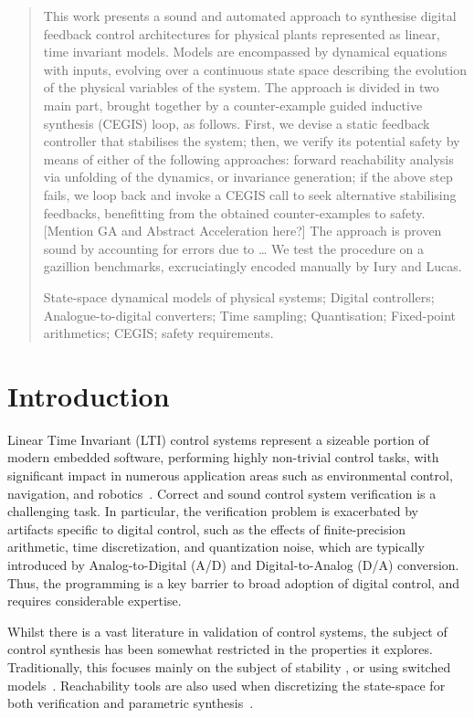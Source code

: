 \documentclass[runningheads,a4paper]{llncs}
\newcommand{\keywords}[1]{\par\addvspace\baselineskip
\noindent\keywordname\enspace\ignorespaces#1}
\begin{document}
\begin{abstract}
This work presents a sound and automated approach to synthesise digital feedback control architectures for physical plants represented as linear, time invariant models. 
Models are encompassed by dynamical equations with inputs, evolving over a continuous state space describing the evolution of the physical variables of the system.  
The approach is divided in two main part, brought together by a counter-example guided inductive synthesis (CEGIS) loop, as follows.   
First, we devise a static feedback controller that stabilises the system;  
then, we verify its potential safety by means of either of the following approaches: 
forward reachability analysis via unfolding of the dynamics, or invariance generation;  
if the above step fails, we loop back and invoke a CEGIS call to seek alternative stabilising feedbacks, 
benefitting from the obtained counter-examples to safety. 
[Mention GA and Abstract Acceleration here?] 
The approach is proven sound by accounting for errors due to \ldots 
We test the procedure on a gazillion benchmarks, excruciatingly encoded manually by Iury and Lucas. 
\keywords{
State-space dynamical models of physical systems; 
Digital controllers; 
Analogue-to-digital converters; 
Time sampling; 
Quantisation; 
Fixed-point arithmetics; 
CEGIS; 
safety requirements. 
}
\end{abstract}


\section{Introduction}

Linear Time Invariant (LTI) control systems represent a sizeable portion of
modern embedded software, performing highly non-trivial control tasks,
with significant impact in numerous application areas such as
environmental control, navigation, and 
robotics~\cite{astrom1997computer,Franklin15}.
Correct and sound control system verification is a challenging task. 
In particular, the verification problem is exacerbated by artifacts specific 
to digital control, such as the effects of finite-precision arithmetic, 
time discretization, and quantization noise, which are typically introduced 
by Analog-to-Digital (A/D) and Digital-to-Analog (D/A) conversion.  
Thus, the programming is a key barrier to broad adoption of digital control, 
and requires considerable expertise.

Whilst there is a vast literature in validation of control systems,
the subject of control synthesis has been somewhat restricted in the
properties it explores.  Traditionally, this focuses mainly on the
subject of stability %
\cite{DBLP:journals/corr/AbateBCCDKK16,sadabadi2016static}, or using switched
models~\cite{DBLP:conf/emsoft/RavanbakhshS16}.
Reachability tools are
also used when discretizing the state-space for both verification and
parametric synthesis~\cite{cimatti2013parameter}.
\end{document}

